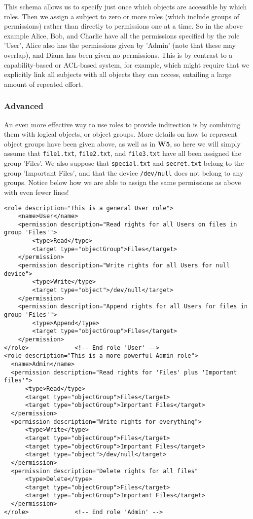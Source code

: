 \documentclass{article}
\providecommand{\inlinecode}{\texttt}
\begin{document}
This schema allows us to specify just once which objects are accessible by which roles. Then we assign a subject to zero or more roles (which include groups of permissions) rather than directly to permissions one at a time. So in the above example Alice, Bob, and Charlie have all the permissions specified by the role 'User', Alice also has the permissions given by 'Admin' (note that these may overlap), and Diana has been given no permissions.
This is by contrast to a capability-based or ACL-based system, for example, which might require that we explicitly link all subjects with all objects they can access, entailing a large amount of repeated effort.

\subsubsection{Advanced}
An even more effective way to use roles to provide indirection is by combining them with logical objects, or object groups. More details on how to represent object groups have been given above, as well as in \textbf{W5},
so here we will simply assume that \inlinecode{file1.txt}, \inlinecode{file2.txt}, and \inlinecode{file3.txt} have all been assigned the group 'Files'. We also suppose that \inlinecode{special.txt} and \inlinecode{secret.txt} belong to the group 'Important Files', and that the device \inlinecode{/dev/null} does not belong to any groups. Notice below how we are able to assign the same permissions as above with even fewer lines! \pagebreak
\begin{lstlisting}
<role description="This is a general User role">
    <name>User</name>
    <permission description="Read rights for all Users on files in group 'Files'">
        <type>Read</type>
        <target type="objectGroup">Files</target>
    </permission>
    <permission description="Write rights for all Users for null device">
        <type>Write</type>
        <target type="object">/dev/null</target>
    </permission>
    <permission description="Append rights for all Users for files in group 'Files'">
        <type>Append</type>
        <target type="objectGroup">Files</target>
    </permission>
</role>             <!-- End role 'User' -->
<role description="This is a more powerful Admin role">
  <name>Admin</name>
  <permission description="Read rights for 'Files' plus 'Important files'">
      <type>Read</type>
      <target type="objectGroup">Files</target>
      <target type="objectGroup">Important Files</target>
  </permission>
  <permission description="Write rights for everything">
      <type>Write</type>
      <target type="objectGroup">Files</target>
      <target type="objectGroup">Important Files</target>
      <target type="object">/dev/null</target>
  </permission>
  <permission description="Delete rights for all files"
      <type>Delete</type>
      <target type="objectGroup">Files</target>
      <target type="objectGroup">Important Files</target>
  </permission>
</role>             <!-- End role 'Admin' -->
\end{lstlisting}
\end{document}
